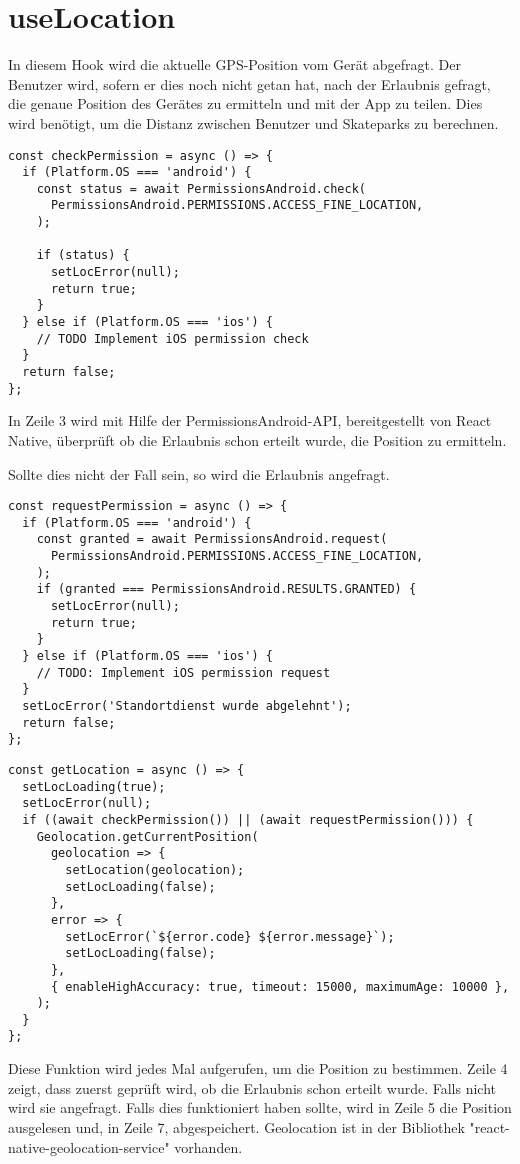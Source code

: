 \section{useLocation}
In diesem Hook wird die aktuelle GPS-Position vom Gerät abgefragt. Der Benutzer wird, sofern er dies
noch nicht getan hat, nach der Erlaubnis gefragt, die genaue Position des Gerätes zu ermitteln und
mit der App zu teilen. Dies wird benötigt, um die Distanz zwischen Benutzer und Skateparks zu
berechnen.

\begin{lstlisting}
const checkPermission = async () => {
  if (Platform.OS === 'android') {
    const status = await PermissionsAndroid.check(
      PermissionsAndroid.PERMISSIONS.ACCESS_FINE_LOCATION,
    );

    if (status) {
      setLocError(null);
      return true;
    }
  } else if (Platform.OS === 'ios') {
    // TODO Implement iOS permission check
  }
  return false;
};
\end{lstlisting}

In Zeile 3 wird mit Hilfe der PermissionsAndroid-API, bereitgestellt von React Native, überprüft
ob die Erlaubnis schon erteilt wurde, die Position zu ermitteln.

Sollte dies nicht der Fall sein, so wird die Erlaubnis angefragt.

\begin{lstlisting}
const requestPermission = async () => {
  if (Platform.OS === 'android') {
    const granted = await PermissionsAndroid.request(
      PermissionsAndroid.PERMISSIONS.ACCESS_FINE_LOCATION,
    );
    if (granted === PermissionsAndroid.RESULTS.GRANTED) {
      setLocError(null);
      return true;
    }
  } else if (Platform.OS === 'ios') {
    // TODO: Implement iOS permission request
  }
  setLocError('Standortdienst wurde abgelehnt');
  return false;
};
\end{lstlisting}

\begin{lstlisting}
const getLocation = async () => {
  setLocLoading(true);
  setLocError(null);
  if ((await checkPermission()) || (await requestPermission())) {
    Geolocation.getCurrentPosition(
      geolocation => {
        setLocation(geolocation);
        setLocLoading(false);
      },
      error => {
        setLocError(`${error.code} ${error.message}`);
        setLocLoading(false);
      },
      { enableHighAccuracy: true, timeout: 15000, maximumAge: 10000 },
    );
  }
};
\end{lstlisting}

Diese Funktion wird jedes Mal aufgerufen, um die Position zu bestimmen. Zeile 4 zeigt, dass zuerst
geprüft wird, ob die Erlaubnis schon erteilt wurde. Falls nicht wird sie angefragt. Falls dies
funktioniert haben sollte, wird in Zeile 5 die Position ausgelesen und, in Zeile 7, abgespeichert.
Geolocation ist in der Bibliothek "react-native-geolocation-service" vorhanden.